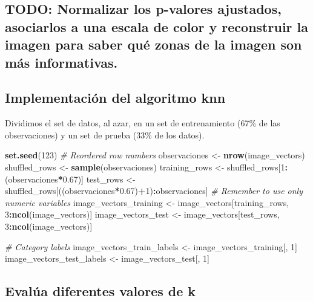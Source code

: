 \documentclass[]{article}
\newenvironment{Shaded}{\begin{snugshade}}{\end{snugshade}}
\newcommand{\KeywordTok}[1]{\textcolor[rgb]{0.13,0.29,0.53}{\textbf{#1}}}
\newcommand{\DecValTok}[1]{\textcolor[rgb]{0.00,0.00,0.81}{#1}}
\newcommand{\FloatTok}[1]{\textcolor[rgb]{0.00,0.00,0.81}{#1}}
\newcommand{\StringTok}[1]{\textcolor[rgb]{0.31,0.60,0.02}{#1}}
\newcommand{\CommentTok}[1]{\textcolor[rgb]{0.56,0.35,0.01}{\textit{#1}}}
\newcommand{\OperatorTok}[1]{\textcolor[rgb]{0.81,0.36,0.00}{\textbf{#1}}}
\newcommand{\NormalTok}[1]{#1}
\begin{document}
\subsection{TODO: Normalizar los p-valores ajustados, asociarlos a una
escala de color y reconstruir la imagen para saber qué zonas de la
imagen son más
informativas.}\label{todo-normalizar-los-p-valores-ajustados-asociarlos-a-una-escala-de-color-y-reconstruir-la-imagen-para-saber-quuxe9-zonas-de-la-imagen-son-muxe1s-informativas.}

\subsection{Implementación del algoritmo
knn}\label{implementaciuxf3n-del-algoritmo-knn}

Dividimos el set de datos, al azar, en un set de entrenamiento (67\% de
las observaciones) y un set de prueba (33\% de los datos).

\begin{Shaded}
\begin{Highlighting}[]
\KeywordTok{set.seed}\NormalTok{(}\DecValTok{123}\NormalTok{)}
\CommentTok{# Reordered row numbers}
\NormalTok{observaciones <-}\StringTok{ }\KeywordTok{nrow}\NormalTok{(image_vectors)}
\NormalTok{shuffled_rows <-}\StringTok{ }\KeywordTok{sample}\NormalTok{(observaciones)}
\NormalTok{training_rows <-}\StringTok{ }\NormalTok{shuffled_rows[}\DecValTok{1}\OperatorTok{:}\NormalTok{(observaciones}\OperatorTok{*}\FloatTok{0.67}\NormalTok{)]}
\NormalTok{test_rows <-}\StringTok{ }\NormalTok{shuffled_rows[((observaciones}\OperatorTok{*}\FloatTok{0.67}\NormalTok{)}\OperatorTok{+}\DecValTok{1}\NormalTok{)}\OperatorTok{:}\NormalTok{observaciones]}
\CommentTok{# Remember to use only numeric variables}
\NormalTok{image_vectors_training <-}\StringTok{ }\NormalTok{image_vectors[training_rows, }\DecValTok{3}\OperatorTok{:}\KeywordTok{ncol}\NormalTok{(image_vectors)]}
\NormalTok{image_vectors_test <-}\StringTok{ }\NormalTok{image_vectors[test_rows, }\DecValTok{3}\OperatorTok{:}\KeywordTok{ncol}\NormalTok{(image_vectors)]}

\CommentTok{# Category labels}
\NormalTok{image_vectors_train_labels <-}\StringTok{ }\NormalTok{image_vectors_training[, }\DecValTok{1}\NormalTok{]}
\NormalTok{image_vectors_test_labels <-}\StringTok{ }\NormalTok{image_vectors_test[, }\DecValTok{1}\NormalTok{]}
\end{Highlighting}
\end{Shaded}

\subsection{Evalúa diferentes valores de
k}\label{evaluxfaa-diferentes-valores-de-k}
\end{document}
